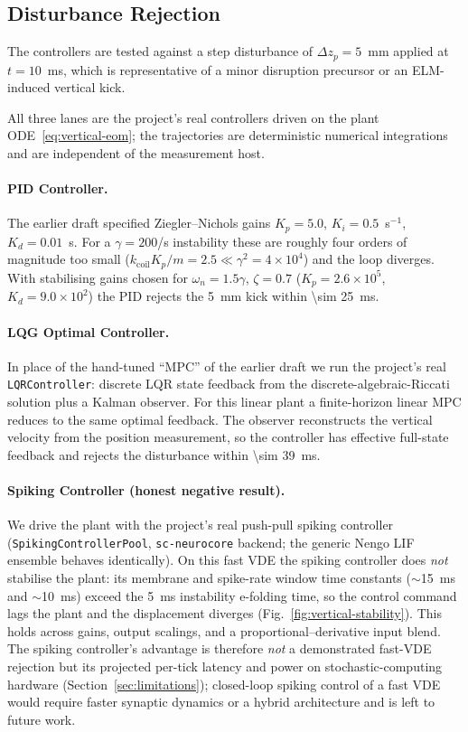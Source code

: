 \documentclass[12pt]{article}
\begin{document}
\subsection{Disturbance Rejection}

The controllers are tested against a step disturbance of $\Delta z_p =
5$~mm applied at $t = 10$~ms, which is representative of a minor
disruption precursor or an ELM-induced vertical kick.

All three lanes are the project's real controllers driven on the plant
ODE~\eqref{eq:vertical-eom}; the trajectories are deterministic numerical
integrations and are independent of the measurement host.

\paragraph{PID Controller.}
The earlier draft specified Ziegler--Nichols gains $K_p = 5.0$,
$K_i = 0.5$~s$^{-1}$, $K_d = 0.01$~s.  For a $\gamma = 200$/s instability
these are roughly four orders of magnitude too small
($k_{\mathrm{coil}} K_p / m = 2.5 \ll \gamma^2 = 4\times10^{4}$) and the loop
diverges.  With stabilising gains chosen for $\omega_n = 1.5\gamma$,
$\zeta = 0.7$ ($K_p = 2.6\times10^{5}$, $K_d = 9.0\times10^{2}$) the PID rejects
the \SI{5}{\milli\metre} kick within \SI{\sim 25}{\milli\second}.

\paragraph{LQG Optimal Controller.}
In place of the hand-tuned ``MPC'' of the earlier draft we run the project's
real \texttt{LQRController}: discrete LQR state feedback from the
discrete-algebraic-Riccati solution plus a Kalman observer.  For this linear
plant a finite-horizon linear MPC reduces to the same optimal feedback.  The
observer reconstructs the vertical velocity from the position measurement, so
the controller has effective full-state feedback and rejects the disturbance
within \SI{\sim 39}{\milli\second}.

\paragraph{Spiking Controller (honest negative result).}
We drive the plant with the project's real push-pull spiking controller
(\texttt{SpikingControllerPool}, \texttt{sc-neurocore} backend; the generic
Nengo LIF ensemble behaves identically).  On this fast VDE the spiking
controller does \emph{not} stabilise the plant: its membrane and spike-rate
window time constants ($\sim$\SI{15}{\milli\second} and
$\sim$\SI{10}{\milli\second}) exceed the \SI{5}{\milli\second} instability
e-folding time, so the control command lags the plant and the displacement
diverges (Fig.~\ref{fig:vertical-stability}).  This holds across gains, output
scalings, and a proportional--derivative input blend.  The spiking controller's
advantage is therefore \emph{not} a demonstrated fast-VDE rejection but its
projected per-tick latency and power on stochastic-computing hardware
(Section~\ref{sec:limitations}); closed-loop spiking control of a fast VDE would
require faster synaptic dynamics or a hybrid architecture and is left to future
work.
\end{document}
